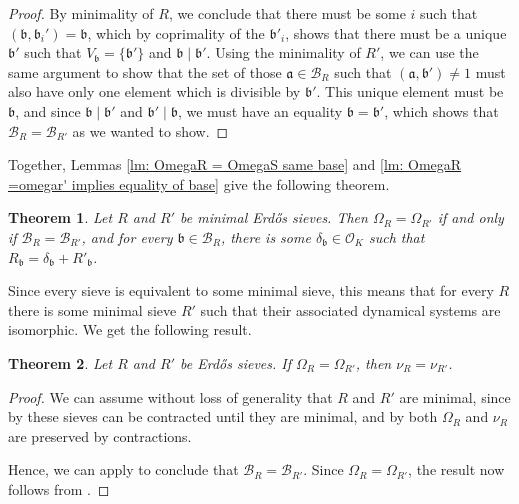 \documentclass[a4paper,11pt,reqno]{amsart}
\theoremstyle{plain}
\newtheorem{theorem}{Theorem}[section]
\theoremstyle{remark}
\newcommand{\cb}{\mathcal{B}}
\newcommand{\co}{\mathcal{O}}
\newcommand{\ga}{\mathfrak{a}}
\newcommand{\gb}{\mathfrak{b}}
\begin{document}
\begin{proof}
				By minimality of $R$, we conclude that there must be some $i$ such that $ (\gb,\gb_i') = \gb$, which by coprimality of the $\gb'_i$, shows that there must be a unique $\gb'$ such that $V_\gb = \{\gb'\}$ and $\gb \mid \gb'$. Using the minimality of $R'$, we can use the same argument to show that the set of those $\ga \in \cb_R$ such that $(\ga,\gb') \neq 1$ must also have only one element which is divisible by $\gb'$. This unique element must be $\gb$, and since $\gb \mid \gb'$ and $\gb' \mid \gb$, we must have an equality $\gb = \gb'$, which shows that $\cb_R = \cb_{R'}$ as we wanted to show.
			\end{proof}
			
			Together, Lemmas \ref{lm: OmegaR = OmegaS same base} and \ref{lm: OmegaR =omegar' implies equality of base} give the following theorem.
			
			\begin{theorem}
				\label{thm: Equaivalence for omegaR = omegaRp}
				Let $R$ and $R'$ be minimal Erdős sieves. Then $\Omega_R = \Omega_{R'}$ if and only if $\cb_R = \cb_{R'}$, and for every $\gb \in \cb_R$, there is some $\delta_\gb \in \co_K$ such that $R_\gb = \delta_\gb + R'_\gb$.
			\end{theorem}
			
			Since every sieve is equivalent to some minimal sieve, this means that for every $R$ there is some minimal sieve $R'$ such that their associated dynamical systems are isomorphic. We get the following result.
			
			\begin{theorem}
				\label{thm: Omegar = Omegar' implies equal measures}
				Let $R$ and $R'$ be Erdős sieves. If $\Omega_R = \Omega_{R'}$, then $\nu_R = \nu_{R'}$.
			\end{theorem}
			
			\begin{proof}
				We can assume without loss of generality that $R$ and $R'$ are minimal, since by   these sieves can be contracted until they are minimal, and by   both $\Omega_R$ and $\nu_R$ are preserved by contractions.
				
				Hence, we can apply   to conclude that $\cb_R= \cb_{R'}$. Since $\Omega_{R} = \Omega_{R'}$, the result now follows from  .			
			\end{proof}
			
\end{document}

